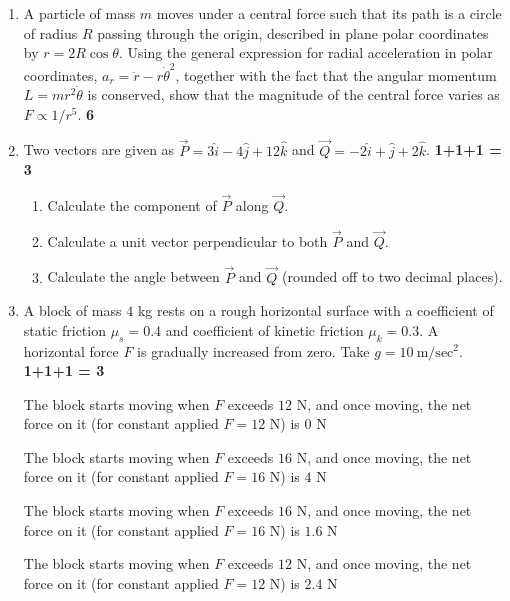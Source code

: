 \documentclass[11pt]{article}
\newcommand{\opt}[2]{%
  \begin{minipage}[t]{0.9\linewidth}
    \fbox{\textbf{#1}}\hspace{0.5em}#2
  \end{minipage}\par\vspace{2pt}
}
\begin{document}
\begin{enumerate}[leftmargin=1.6em, label=\arabic*., itemsep=14pt]
\vspace{4pt}
\noindent (ii) Find the time(s) at which the particle is instantaneously at rest, and determine whether the particle is speeding up or slowing down immediately after each such instant. Justify using the sign of the acceleration.

\item A particle of mass $m$ moves under a central force such that its path is a circle of radius $R$ passing through the origin, described in plane polar coordinates by $r = 2R\cos\theta$. Using the general expression for radial acceleration in polar coordinates, $a_r = \ddot{r} - r\dot\theta^2$, together with the fact that the angular momentum $L = mr^2\dot\theta$ is conserved, show that the magnitude of the central force varies as $F \propto 1/r^5$. \hfill \textbf{6}

\item Two vectors are given as $\vec{P} = 3\hat{i} - 4\hat{j} + 12\hat{k}$ and $\vec{Q} = -2\hat{i} + \hat{j} + 2\hat{k}$. \hfill \textbf{1+1+1 = 3}
\begin{enumerate}[label=(\roman*)]
  \item Calculate the component of $\vec{P}$ along $\vec{Q}$.
  \item Calculate a unit vector perpendicular to both $\vec{P}$ and $\vec{Q}$.
  \item Calculate the angle between $\vec{P}$ and $\vec{Q}$ (rounded off to two decimal places).
\end{enumerate}

\item A block of mass $4$ kg rests on a rough horizontal surface with a coefficient of static friction $\mu_s = 0.4$ and coefficient of kinetic friction $\mu_k = 0.3$. A horizontal force $F$ is gradually increased from zero. Take $g = 10\ \mathrm{m/sec^2}$. \hfill \textbf{1+1+1 = 3}
\opt{a}{The block starts moving when $F$ exceeds $12$ N, and once moving, the net force on it (for constant applied $F = 12$ N) is $0$ N}
\opt{b}{The block starts moving when $F$ exceeds $16$ N, and once moving, the net force on it (for constant applied $F = 16$ N) is $4$ N}
\opt{c}{The block starts moving when $F$ exceeds $16$ N, and once moving, the net force on it (for constant applied $F = 16$ N) is $1.6$ N}
\opt{d}{The block starts moving when $F$ exceeds $12$ N, and once moving, the net force on it (for constant applied $F = 12$ N) is $2.4$ N}


\end{enumerate}
\end{document}
